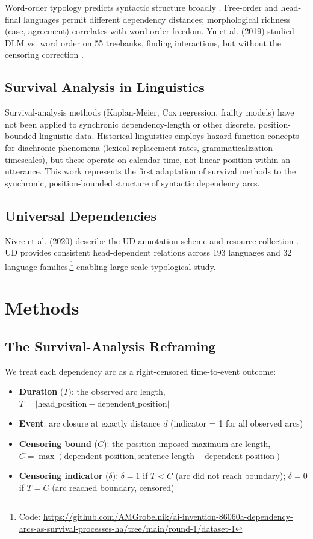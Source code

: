 \documentclass[11pt,letterpaper]{article}
\begin{document}
Word-order typology predicts syntactic structure broadly \citep{Dryer2013}. Free-order and head-final languages permit different dependency distances; morphological richness (case, agreement) correlates with word-order freedom. Yu et al. (2019) studied DLM vs. word order on 55 treebanks, finding interactions, but without the censoring correction \citep{Yu2019}.

\subsection{Survival Analysis in Linguistics}

Survival-analysis methods (Kaplan-Meier, Cox regression, frailty models) have not been applied to synchronic dependency-length or other discrete, position-bounded linguistic data. Historical linguistics employs hazard-function concepts for diachronic phenomena (lexical replacement rates, grammaticalization timescales), but these operate on calendar time, not linear position within an utterance. This work represents the first adaptation of survival methods to the synchronic, position-bounded structure of syntactic dependency arcs.

\subsection{Universal Dependencies}

Nivre et al. (2020) describe the UD annotation scheme and resource collection \citep{Nivre2020}. UD provides consistent head-dependent relations across 193 languages and 32 language families,\footnote{Code: \url{https://github.com/AMGrobelnik/ai-invention-86060a-dependency-arcs-as-survival-processes-ha/tree/main/round-1/dataset-1}} enabling large-scale typological study.

\section{Methods}

\subsection{The Survival-Analysis Reframing}

We treat each dependency arc as a right-censored time-to-event outcome:
\begin{itemize}
\item \textbf{Duration} ($T$): the observed arc length, $T = |\text{head\_position} - \text{dependent\_position}|$
\item \textbf{Event}: arc closure at exactly distance $d$ (indicator = 1 for all observed arcs)
\item \textbf{Censoring bound} ($C$): the position-imposed maximum arc length, $C = \max(\text{dependent\_position}, \text{sentence\_length} - \text{dependent\_position})$
\item \textbf{Censoring indicator} ($\delta$): $\delta=1$ if $T<C$ (arc did not reach boundary); $\delta=0$ if $T=C$ (arc reached boundary, censored)
\end{itemize}
\end{document}
